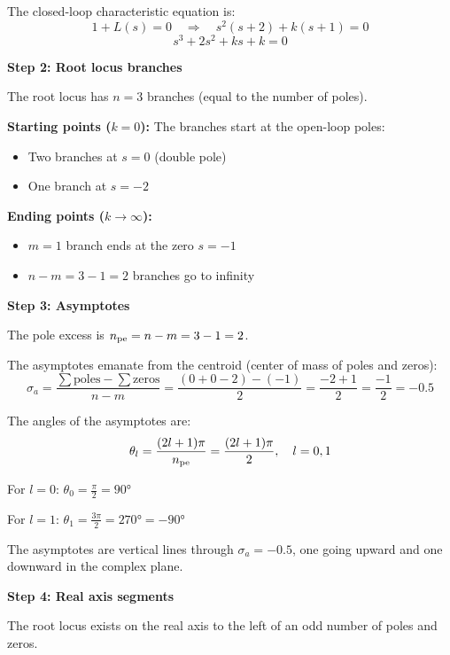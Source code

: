 \documentclass[11pt,a4paper]{article}
\begin{document}
The closed-loop characteristic equation is:
\begin{equation}
  1 + L(s) = 0 \quad \Rightarrow \quad s^2(s+2) + k(s+1) = 0
\end{equation}
\begin{equation}
  s^3 + 2s^2 + ks + k = 0
\end{equation}

\textbf{Step 2: Root locus branches}

The root locus has $n = 3$ branches (equal to the number of poles).

\textbf{Starting points ($k = 0$):} The branches start at the open-loop poles:
\begin{itemize}
  \item Two branches at $s = 0$ (double pole)
  \item One branch at $s = -2$
\end{itemize}

\textbf{Ending points ($k \to \infty$):}
\begin{itemize}
  \item $m = 1$ branch ends at the zero $s = -1$
  \item $n - m = 3 - 1 = 2$ branches go to infinity
\end{itemize}

\textbf{Step 3: Asymptotes}

The pole excess is $n_{\text{pe}} = n - m = 3 - 1 = 2$.

The asymptotes emanate from the centroid (center of mass of poles and zeros):
\begin{equation}
  \sigma_a = \frac{\sum \text{poles} - \sum \text{zeros}}{n - m} = \frac{(0 + 0 - 2) - (-1)}{2} = \frac{-2 + 1}{2} = \frac{-1}{2} = -0.5
\end{equation}

The angles of the asymptotes are:
\begin{equation}
  \theta_l = \frac{(2l + 1)\pi}{n_{\text{pe}}} = \frac{(2l + 1)\pi}{2}, \quad l = 0, 1
\end{equation}

For $l = 0$: $\theta_0 = \frac{\pi}{2} = 90°$

For $l = 1$: $\theta_1 = \frac{3\pi}{2} = 270° = -90°$

The asymptotes are vertical lines through $\sigma_a = -0.5$, one going upward and one downward in the complex plane.

\textbf{Step 4: Real axis segments}

The root locus exists on the real axis to the left of an odd number of poles and zeros.
\end{document}
